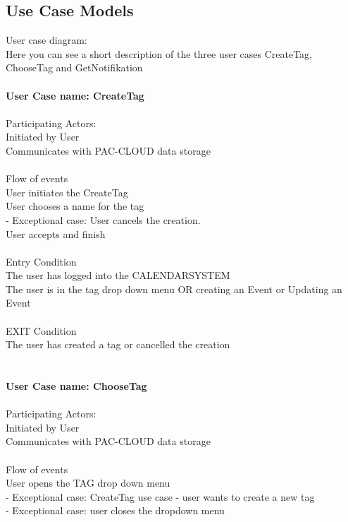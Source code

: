 \subsection{Use Case Models}
User case diagram:\\
Here you can see a short description of the three user cases CreateTag, ChooseTag and GetNotifikation\\\\
\textbf{User Case name: CreateTag}\\
\HRule \\[0.4cm]
Participating Actors:\\
Initiated by User\\
Communicates with PAC-CLOUD data storage\\
\HRule \\[0.4cm]
Flow of events\\
User initiates the CreateTag\\
User chooses a name for the tag\\
 - Exceptional case: User cancels the creation.\\
User accepts and finish\\
\HRule \\[0.4cm]
Entry Condition\\
The user has logged into the CALENDARSYSTEM\\
The user is in the tag drop down menu OR creating an Event or Updating an Event\\
\HRule \\[0.4cm]
EXIT Condition\\
The user has created a tag or cancelled the creation\\\\\\
\textbf{User Case name: ChooseTag}\\
\HRule \\[0.4cm]
Participating Actors:\\
Initiated by User\\
Communicates with PAC-CLOUD data storage\\
\HRule \\[0.4cm]
Flow of events\\
User opens the TAG drop down menu\\
 - Exceptional case: CreateTag use case - user wants to create a new tag\\
 - Exceptional case: user closes the dropdown menu\\
